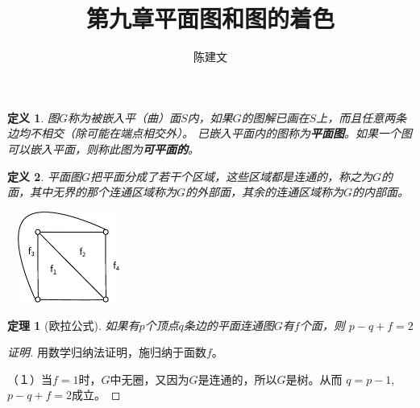 \documentclass{article}
\newtheorem{Def}{定义}
\newtheorem{Thm}{定理}
\begin{document}
\begin{CJK*}{UTF8}{gbsn}
  \title{第九章平面图和图的着色}
  \author{陈建文}
  \maketitle
  

  \begin{Def}
    图$G$称为被嵌入平（曲）面$S$内，如果$G$的图解已画在$S$上，而且任意两条边均不相交（除可能在端点相交外）。
已嵌入平面内的图称为{\bfseries 平面图}。如果一个图可以嵌入平面，则称此图为{\bfseries 可平面的}。
\end{Def}
  \begin{Def}
    平面图$G$把平面分成了若干个区域，这些区域都是连通的，称之为$G$的面，其中无界的那个连通区域称为$G$的外部面，其余的连通区域称为$G$的内部面。
  \end{Def}
  \begin{center}
  \includegraphics[width=4cm,height=3cm]{face}
\end{center}
\begin{Thm}[欧拉公式]
    如果有$p$个顶点$q$条边的平面连通图$G$有$f$个面，则
      $p - q + f = 2$
    \end{Thm}
    \begin{proof}[证明]
\mbox{}\par{}
    用数学归纳法证明，施归纳于面数$f$。

  （１）当$f=1$时，$G$中无圈，又因为$G$是连通的，所以$G$是树。从而
  $q=p-1$,$p-q+f=2$成立。


\end{proof}
\end{CJK*}
\end{document}
